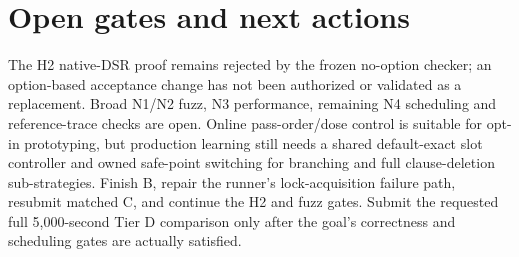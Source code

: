 \documentclass[11pt]{article}
\begin{document}
\section*{Open gates and next actions}
The H2 native-DSR proof remains rejected by the frozen no-option checker; an
option-based acceptance change has not been authorized or validated as a
replacement. Broad N1/N2 fuzz, N3 performance, remaining N4 scheduling and
reference-trace checks are open. Online pass-order/dose control is suitable
for opt-in prototyping, but production learning still needs a shared
default-exact slot controller and owned safe-point switching for branching
and full clause-deletion sub-strategies. Finish B, repair the runner's
lock-acquisition failure path, resubmit matched C, and continue the H2 and
fuzz gates. Submit the requested full 5,000-second Tier D comparison only
after the goal's correctness and scheduling gates are actually satisfied.
\end{document}

